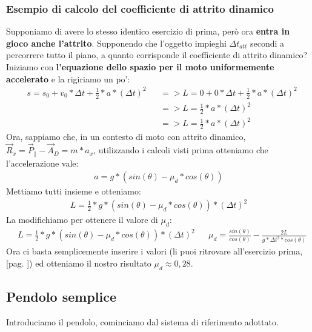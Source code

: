         \subsubsection{Esempio di calcolo del coefficiente di attrito dinamico}
            Supponiamo di avere lo stesso identico esercizio di prima, però ora \textbf{entra in gioco anche l'attrito}. Supponendo che l'oggetto impieghi $\Delta t_{att}$ secondi a percorrere tutto il piano, a quanto corrisponde il coefficiente di attrito dinamico?\\
            Iniziamo con \textbf{l'equazione dello spazio per il moto uniformemente accelerato} e la rigiriamo un po':
            \begin{align*}
                &s = s_0 + v_0*\Delta t + \frac{1}{2}*a*(\Delta t)^2 &&=> L = 0 + 0*\Delta t + \frac{1}{2}*a*(\Delta t)^2\\
                & && => L = \frac{1}{2}*a*(\Delta t)^2\\
                & && => L = \frac{1}{2}*a*(\Delta t)^2
            \end{align*}
            Ora, sappiamo che, in un contesto di moto con attrito dinamico, $\vec{R}_x = \vec{P}_\parallel -\vec{A}_D = m * a_x$, utilizzando i calcoli visti prima otteniamo che l'accelerazione vale:
            \begin{align*}
                a = g*(sin(\theta) - \mu_d*cos(\theta))
            \end{align*}
            Mettiamo tutti insieme e otteniamo:
            \begin{align*}
                L = \frac{1}{2}*g*(sin(\theta) - \mu_d*cos(\theta))*(\Delta t)^2
            \end{align*}
            La modifichiamo per ottenere il valore di $\mu_d$:
            \begin{align*}
                &L = \frac{1}{2}*g*(sin(\theta) - \mu_d*cos(\theta))*(\Delta t)^2 && \mu_d =\frac{sin(\theta)}{cos(\theta)}-\frac{2L}{g*\Delta t^2*cos(\theta)}
            \end{align*}
            Ora ci basta semplicemente inserire i valori (li puoi ritrovare all'esercizio prima, [pag. \pageref{EsercizioConAttrito}]) ed otteniamo il nostro risultato $\mu_d \approx 0,28$.

    \subsection{Pendolo semplice}
        Introduciamo il pendolo, cominciamo dal sistema di riferimento adottato.

